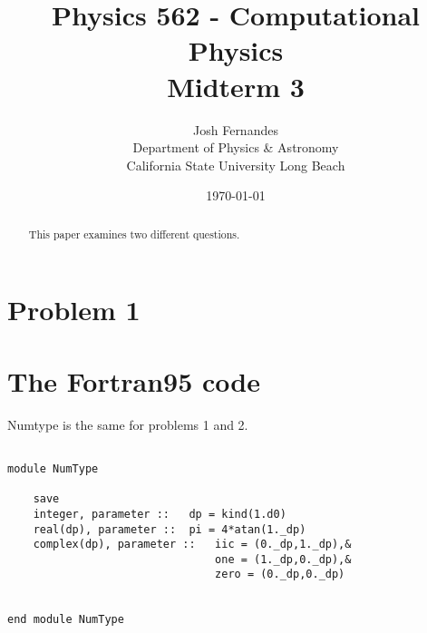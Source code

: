 \documentclass[12pt]{article}
\begin{document}




\title{Physics 562 - Computational Physics\\[.5cm]
Midterm 3}
\author{Josh Fernandes\\
Department of Physics \& Astronomy\\
California State University Long Beach}
\date{\today}

  
\maketitle



\begin{abstract}
This paper examines two different questions. 
\end{abstract}


\section{Problem 1}

\section{The Fortran95 code}

Numtype is the same for problems 1 and 2. 
\begin{lstlisting}[frame=single,caption={Module {\tt NumType}},label=module]

module NumType

	save
	integer, parameter :: 	dp = kind(1.d0)	
	real(dp), parameter :: 	pi = 4*atan(1._dp)
	complex(dp), parameter :: 	iic = (0._dp,1._dp),&	
								one = (1._dp,0._dp),&
								zero = (0._dp,0._dp)


end module NumType

\end{lstlisting}
\end{document}
